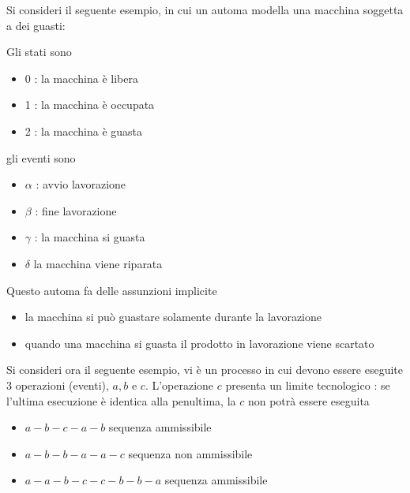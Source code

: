 \documentclass[10pt, letterpaper]{report}
\begin{document}
Si consideri il seguente esempio, in cui un automa modella una macchina soggetta a dei guasti:
\begin{center}
\end{center}
Gli stati sono\begin{itemize}
    \item $0$ : la macchina è libera 
    \item 1 : la macchina è occupata 
    \item 2 : la macchina è guasta 
\end{itemize}
gli eventi sono\begin{itemize}
    \item  $\alpha$ : avvio lavorazione
    \item $\beta$ : fine lavorazione 
    \item $\gamma$ : la macchina si guasta 
    \item $\delta$ la macchina viene riparata
\end{itemize}
Questo automa fa delle assunzioni implicite\begin{itemize}
    \item la macchina si può guastare solamente durante la lavorazione 
    \item quando una macchina si guasta il prodotto in lavorazione viene scartato
\end{itemize}
Si consideri ora il seguente esempio, vi è un processo in cui devono essere eseguite 3 operazioni (eventi), $a,b$ e $c$. L'operazione $c$ presenta un limite tecnologico : se l'ultima esecuzione è identica alla penultima, la $c$ non potrà essere eseguita\begin{itemize}
    \item $a-b-c-a-b$ sequenza ammissibile 
    \item $a-b-b-a-a-c$ sequenza non ammissibile 
    \item $a-a-b-c-c-b-b-a$ sequenza ammissibile
\end{itemize}
\end{document}
